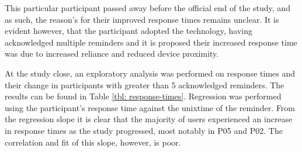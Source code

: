 This particular participant passed away before the official end of the study, and as such, the reason's for their improved response times remains unclear. It is evident however, that the participant adopted the technology, having acknowledged multiple reminders and it is proposed their increased response time was due to increased reliance and reduced device proximity.

At the study close, an exploratory analysis was performed on response times and their change in participants with greater than 5 acknowledged reminders. The results can be found in Table \ref{tbl: response-times}. Regression was performed using the participant's response time against the unixtime of the reminder. From the regression slope it is clear that the majority of users experienced an increase in response times as the study progressed, most notably in P05 and P02. The correlation and fit of this slope, however, is poor.

\begin{table}[h]
\centering
\caption{Response times and regression statistics for participants with greater than 5 acknowledged reminders.}
\label{tbl: response-times}
\end{table}

